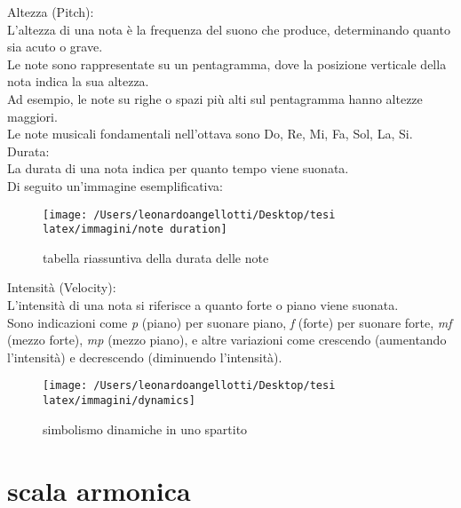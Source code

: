 \documentclass[a4paper,12pt]{report}
\begin{document}
Altezza (Pitch): \\
L'altezza di una nota è la frequenza del suono che produce, determinando quanto sia acuto o grave. \\
Le note sono rappresentate su un pentagramma, dove la posizione verticale della nota indica la sua altezza. \\
Ad esempio, le note su righe o spazi più alti sul pentagramma hanno altezze maggiori. \\
Le note musicali fondamentali nell'ottava sono Do, Re, Mi, Fa, Sol, La, Si. \\

Durata: \\
La durata di una nota indica per quanto tempo viene suonata. \\
Di seguito un'immagine esemplificativa:

\begin{figure}[h!]
    \centering
    \texttt{[image: /Users/leonardoangellotti/Desktop/tesi latex/immagini/note duration]} 
    \caption{tabella riassuntiva della durata delle note}
    \label{fig:immagine}
\end{figure}

Intensità (Velocity): \\
L'intensità di una nota si riferisce a quanto forte o piano viene suonata. \\
Sono indicazioni come \textit{p} (piano) per suonare piano, \textit{f} (forte) per suonare forte, \textit{mf} (mezzo forte), \textit{mp} (mezzo piano), e altre variazioni come crescendo (aumentando l'intensità) e decrescendo (diminuendo l'intensità).

\begin{figure}[h!]
    \centering
    \texttt{[image: /Users/leonardoangellotti/Desktop/tesi latex/immagini/dynamics]} 
    \caption{simbolismo dinamiche in uno spartito}
    \label{fig:immagine}
\end{figure}

\section{scala armonica}
\end{document}
